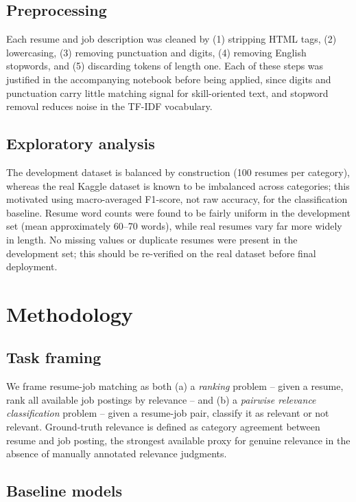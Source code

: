\documentclass[conference]{IEEEtran}
\begin{document}
\subsection{Preprocessing}

Each resume and job description was cleaned by (1) stripping HTML tags, (2) lowercasing, (3) removing punctuation and digits, (4) removing English stopwords, and (5) discarding tokens of length one. Each of these steps was justified in the accompanying notebook before being applied, since digits and punctuation carry little matching signal for skill-oriented text, and stopword removal reduces noise in the TF-IDF vocabulary.

\subsection{Exploratory analysis}

The development dataset is balanced by construction (100 resumes per category), whereas the real Kaggle dataset is known to be imbalanced across categories; this motivated using macro-averaged F1-score, not raw accuracy, for the classification baseline. Resume word counts were found to be fairly uniform in the development set (mean approximately 60--70 words), while real resumes vary far more widely in length. No missing values or duplicate resumes were present in the development set; this should be re-verified on the real dataset before final deployment.

\section{Methodology}

\subsection{Task framing}

We frame resume-job matching as both (a) a \emph{ranking} problem -- given a resume, rank all available job postings by relevance -- and (b) a \emph{pairwise relevance classification} problem -- given a resume-job pair, classify it as relevant or not relevant. Ground-truth relevance is defined as category agreement between resume and job posting, the strongest available proxy for genuine relevance in the absence of manually annotated relevance judgments.

\subsection{Baseline models}
\end{document}
